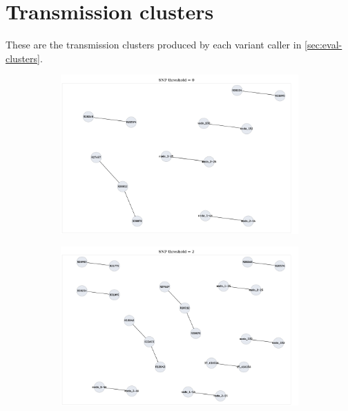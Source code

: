 \section{Transmission clusters}

These are the transmission clusters produced by each variant caller in \autoref{sec:eval-clusters}.

\begin{figure}
     \centering
     \begin{subfigure}[b]{0.45\textwidth}
         \centering
         \includegraphics[width=\textwidth]{Appendix1/Figs/compass_clusters_t0.png}
         \caption{}
     \end{subfigure}
     \hfill
     \begin{subfigure}[b]{0.45\textwidth}
         \centering
         \includegraphics[width=\textwidth]{Appendix1/Figs/compass_clusters_t2.png}
         \caption{}

\end{subfigure}
\end{figure}
